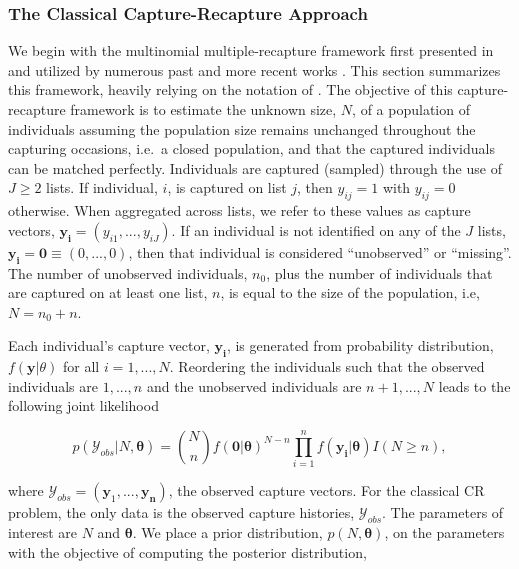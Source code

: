\documentclass[
  12pt,
]{article}
\begin{document}
\subsubsection{The Classical Capture-Recapture Approach}
\label{sec:classicalCR}

We begin with the multinomial multiple-recapture framework first
presented in \cite{darroch_multiple-recapture_1958} and utilized by
numerous past and more recent works \citep{sandland_statistical_1984}.
This section summarizes this framework, heavily relying on the notation
of \cite{manriquevallier_bayesian_2016}. The objective of this
capture-recapture framework is to estimate the unknown size, \(N\), of a
population of individuals assuming the population size remains unchanged
throughout the capturing occasions, i.e.~a closed population, and that
the captured individuals can be matched perfectly. Individuals are
captured (sampled) through the use of \(J\ge 2\) lists. If individual,
\(i\), is captured on list \(j\), then \(y_{ij}=1\) with \(y_{ij}=0\)
otherwise. When aggregated across lists, we refer to these values as
capture vectors, \(\boldsymbol{y_i} = (y_{i1},...,y_{iJ})\). If an
individual is not identified on any of the \(J\) lists,
\(\boldsymbol{y_i} = \textbf{0} \equiv (0,...,0)\), then that individual
is considered ``unobserved'' or ``missing''. The number of unobserved
individuals, \(n_0\), plus the number of individuals that are captured
on at least one list, \(n\), is equal to the size of the population,
i.e, \(N = n_0 + n\).

Each individual's capture vector, \(\boldsymbol{y_i}\), is generated
from probability distribution, \(f(\boldsymbol{y}|\theta)\) for all
\(i = 1,...,N\). Reordering the individuals such that the observed
individuals are \(1,...,n\) and the unobserved individuals are
\(n+1,...,N\) leads to the following joint likelihood

\begin{equation}
\label{eqn:jointlikelihoodequation1}
p(\mathcal{Y}_{obs}|N,\boldsymbol{\theta})=\binom{N}{n} f(\boldsymbol{0}|\boldsymbol{\theta})^{N-n}\prod_{i=1}^n f(\boldsymbol{y_i}|\boldsymbol{\theta})I(N\ge n),
\end{equation}

where \(\mathcal{Y}_{obs} = (\boldsymbol{y}_1,...,\boldsymbol{y_n})\),
the observed capture vectors. For the classical CR problem, the only
data is the observed capture histories, \(\mathcal{Y}_{obs}\). The
parameters of interest are \(N\) and \(\boldsymbol{\theta}\). We place a
prior distribution, \(p(N,\boldsymbol{\theta})\), on the parameters with
the objective of computing the posterior distribution,
\end{document}
